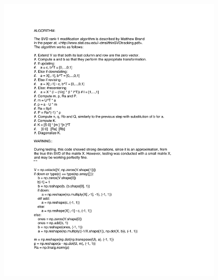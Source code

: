 \documentclass{article}
\begin{document}
\begin{figure}[ht!]
\begin{center}
    \label{overflow}
  \end{center}
\end{figure}

\begin{figure}[ht1!]
  \begin{center}
    \includegraphics[page=1, bb=0.0in 0.0in 8.5in 10in, scale=.5]{half2.pdf}

\end{center}
\end{figure}
\end{document}
